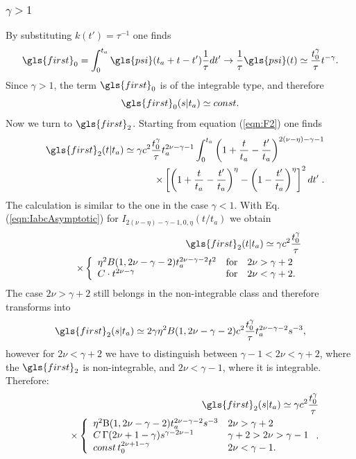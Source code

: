 \subsubsection{$\gamma>1$}
By substituting $k(t')=\tau^{-1}$ one finds 
\begin{equation}
 \gls{first}_0 = \int_0^{t_a} \gls{psi}(t_a + t- t') \frac{1}{\tau} dt' \to \frac{1}{\tau} \gls{psi}(t) \simeq \frac{t_0^\gamma}{\tau} t^{-\gamma}.
\end{equation}
Since $\gamma > 1$, the term $\gls{first}_0$ is of the integrable type, and therefore
\begin{equation}
 \gls{first}_0(s|t_a) \simeq const. 
\end{equation}
Now we turn to $\gls{first}_2$.  Starting from equation (\ref{eqn:F2}) one finds 
\begin{eqnarray}
&& \gls{first}_{2}(t|t_a) \simeq   \gamma c^2 \frac{t_0^{\gamma} }{\tau}  t_a^{2\nu-\gamma-1}\int^{t_a}_0 \left(1+\frac{t}{t_a}-\frac{t'}{t_a} \right)^{2(\nu-\eta)-\gamma-1} \nonumber \\
&& \qquad \times \left[ \left(1+\frac{t}{t_a}-\frac{t'}{t_a} \right)^\eta-\left(1- \frac{t'}{t_a}\right)^\eta \right]^2  dt' \; .
\end{eqnarray}
The calculation is similar to the one in the case $\gamma<1$. With Eq.(\ref{eqn:IabcAsymptotic}) for $I_{2(\nu-\eta)-\gamma-1,0,\eta}(t/t_a)$ we obtain 
\begin{eqnarray}
&& \gls{first}_{2}(t|t_a) \simeq  \gamma c^2 \frac{ t_0^{\gamma} }{\tau}    \\
&& \;\;\; \times \left\{ \begin{array}{l l l}
\eta^2 B(1, 2\nu -\gamma -2) t_a^{2\nu-\gamma-2}t^2  &\mathrm{for} & 2\nu> \gamma+2\\
 C \cdot t^{2\nu-\gamma} & \mathrm{for} & 2\nu < \gamma+2.
\end{array} \right. \nonumber 
\end{eqnarray}
The case $2\nu> \gamma+2$ still belongs in the non-integrable class and therefore transforms into 
\begin{equation}
\gls{first}_{2}(s|t_a) \simeq 2 \gamma \eta^2 B(1,2\nu -\gamma -2) c^2 \frac{t_0^{\gamma}}{\tau}   t_a^{2\nu-\gamma-2}  s^{-3} ,
\end{equation}
however for $2\nu < \gamma+2$ we have to distinguish between $\gamma -1 < 2\nu < \gamma+2$, where the $\gls{first}_2$ is non-integrable, and $2\nu < \gamma -1$, where it is integrable. 
Therefore:
\begin{eqnarray}
&& \gls{first}_{2}(s|t_a) \simeq \gamma  c^2\frac{ t_0^{\gamma}}{\tau} \\
&& \qquad \times \left\{ \begin{array}{l l l}
\eta^2\mathrm{B}(1,2\nu-\gamma-2) t_a^{2\nu-\gamma-2}  s^{-3} & 2\nu> \gamma+2\\
C \, \Gamma(2\nu+1-\gamma) s^{\gamma-2\nu-1} & \gamma+2> 2\nu > \gamma -1\\
const\,t_0^{2\nu+1-\gamma } & 2\nu < \gamma -1.
\end{array} \right. \nonumber .
\end{eqnarray}


